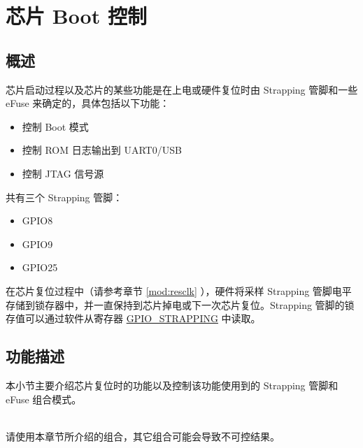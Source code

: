 \documentclass[main\_\_CN.tex]{subfiles}
\begin{document}

\ifglobal
\else
    {\let\clearpage\relax \listoftodos}
    {\let\clearpage\relax \listofdonetodos}
    \tableofcontents
\fi



\hypertarget{bootctrl}{}
\chapter{芯片 Boot 控制}
\label{mod:bootctrl}

\section{概述}

芯片启动过程以及芯片的某些功能是在上电或硬件复位时由 Strapping 管脚和一些 eFuse 来确定的，具体包括以下功能：

\begin{itemize}
    \item 控制 Boot 模式
    \item 控制 ROM 日志输出到 UART0/USB
    \item 控制 JTAG 信号源
\end{itemize}

\chipname{} 共有三个 Strapping 管脚：
\begin{itemize}
    \item GPIO8
    \item GPIO9
    \item GPIO25
\end{itemize}

在芯片复位过程中（请参考章节 \ref{mod:resclk} \textit{}），硬件将采样 Strapping 管脚电平存储到锁存器中，并一直保持到芯片掉电或下一次芯片复位。Strapping 管脚的锁存值可以通过软件从寄存器 \hyperref[fielddesc:GPIOSTRAPPING]{GPIO\_STRAPPING}
中读取。

\section{功能描述}
本小节主要介绍芯片复位时的功能以及控制该功能使用到的 Strapping 管脚和 eFuse 组合模式。

\begin{importantlisting}\\
请使用本章节所介绍的组合，其它组合可能会导致不可控结果。
\end{importantlisting}
\end{document}
